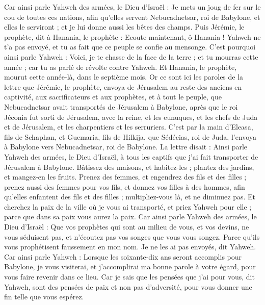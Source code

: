 \begin{multicols}{2}
Car ainsi parle Yahweh des armées, le Dieu d'Israël : Je mets un joug de fer sur le cou de toutes ces nations, afin qu'elles servent Nebucadnetsar, roi de Babylone, et elles le serviront ; et je lui donne aussi les bêtes des champs.
Puis Jérémie, le prophète, dit à Hanania, le prophète : Ecoute maintenant, ô Hanania ! Yahweh ne t'a pas envoyé, et tu as fait que ce peuple se confie au mensonge.
C'est pourquoi ainsi parle Yahweh : Voici, je te chasse de la face de la terre ; et tu mourras cette année ; car tu as parlé de révolte contre Yahweh.
Et Hanania, le prophète, mourut cette année-là, dans le septième mois.
\VerseOne{}Or ce sont ici les paroles de la lettre que Jérémie, le prophète, envoya de Jérusalem au reste des anciens en captivité, aux sacrificateurs et aux prophètes, et à tout le peuple, que Nebucadnetsar avait transportés de Jérusalem à Babylone,
après que le roi Jéconia fut sorti de Jérusalem, avec la reine, et les eunuques, et les chefs de Juda et de Jérusalem, et les charpentiers et les serruriers.
C'est par la main d'Eleasa, fils de Schaphan, et Guemaria, fils de Hilkija, que Sédécias, roi de Juda, l'envoya à Babylone vers Nebucadnetsar, roi de Babylone. La lettre disait :
Ainsi parle Yahweh des armées, le Dieu d'Israël, à tous les captifs que j'ai fait transporter de Jérusalem à Babylone.
Bâtissez des maisons, et habitez-les ; plantez des jardins, et mangez-en les fruits.
Prenez des femmes, et engendrez des fils et des filles ; prenez aussi des femmes pour vos fils, et donnez vos filles à des hommes, afin qu'elles enfantent des fils et des filles ; multipliez-vous là, et ne diminuez pas.
Et cherchez la paix de la ville où je vous ai transporté, et priez Yahweh pour elle ; parce que dans sa paix vous aurez la paix.
Car ainsi parle Yahweh des armées, le Dieu d'Israël : Que vos prophètes qui sont au milieu de vous, et vos devins, ne vous séduisent pas, et n'écoutez pas vos songes que vous vous songez.
Parce qu'ils vous prophétisent faussement en mon nom. Je ne les ai pas envoyés, dit Yahweh.
Car ainsi parle Yahweh : Lorsque les soixante-dix ans seront accomplis pour Babylone, je vous visiterai, et j'accomplirai ma bonne parole à votre égard, pour vous faire revenir dans ce lieu.
Car je sais que les pensées que j'ai pour vous, dit Yahweh, sont des pensées de paix et non pas d'adversité, pour vous donner une fin telle que vous espérez.

\end{multicols}
